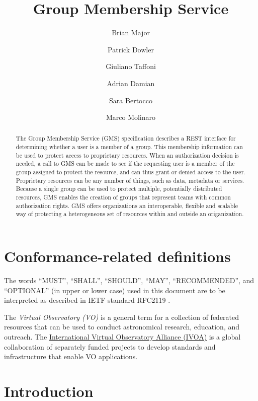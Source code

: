 \documentclass[11pt,a4paper]{ivoa}
\title{Group Membership Service}
\author{Brian Major}
\author{Patrick Dowler}
\author{Giuliano Taffoni}
\author{Adrian Damian}
\author{Sara Bertocco}
\author{Marco Molinaro}
\begin{document}
\begin{abstract}

The Group Membership Service (GMS) specification describes a REST interface for determining whether a user is a member of a group.  This membership information can be used to protect access to proprietary resources.  When an authorization decision is needed, a call to GMS can be made to see if the requesting user is a member of the group assigned to protect the resource, and can thus grant or denied access to the user.  Proprietary resources can be any number of things, such as data, metadata or services.  Because a single group can be used to protect multiple, potentially distributed resources, GMS enables the creation of groups that represent teams with common authorization rights.  GMS offers organizations an interoperable, flexible and scalable way of protecting a heterogeneous set of resources within and outside an origanization.

\end{abstract}

%
%

\section*{Conformance-related definitions}

The words ``MUST'', ``SHALL'', ``SHOULD'', ``MAY'', ``RECOMMENDED'', and
``OPTIONAL'' (in upper or lower case) used in this document are to be
interpreted as described in IETF standard RFC2119 \citep{std:RFC2119}.

The \emph{Virtual Observatory (VO)} is a
general term for a collection of federated resources that can be used
to conduct astronomical research, education, and outreach.
The \href{http://www.ivoa.net}{International
Virtual Observatory Alliance (IVOA)} is a global
collaboration of separately funded projects to develop standards and
infrastructure that enable VO applications.


\section{Introduction}
\end{document}

